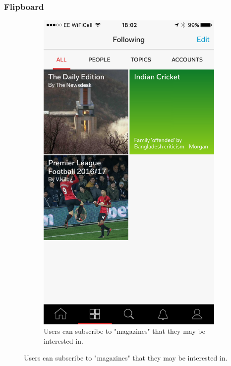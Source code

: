\documentclass[12pt]{article}
\begin{document}
\subsubsection{Flipboard}

\begin{figure}[H]
  \centering
  \begin{subfigure}[t]{0.3\textwidth}
        \includegraphics[width=\textwidth]{FlipboardHome.PNG}
        \caption{Users can subscribe to "magazines" that they may be interested in.}

\end{subfigure}
\end{figure}
\end{document}
